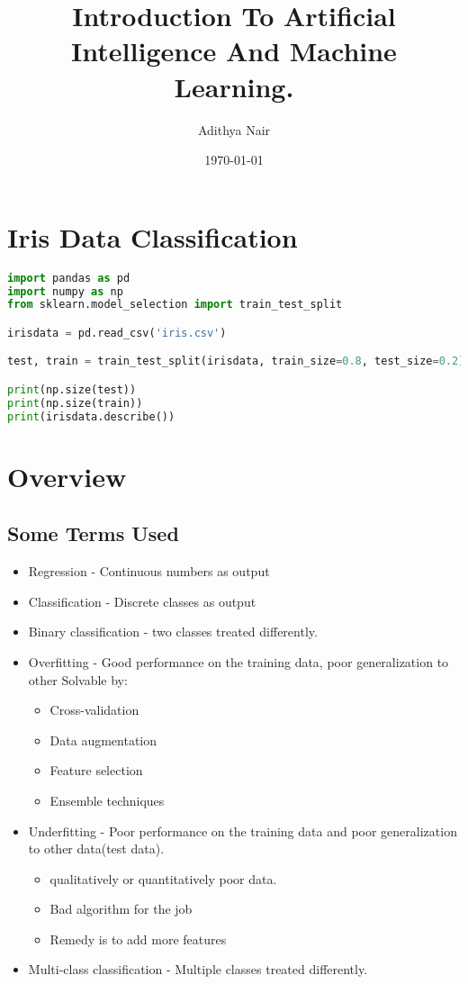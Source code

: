 \documentclass[11pt]{article}
\author{Adithya Nair}
\date{\today}
\title{Introduction To Artificial Intelligence And Machine Learning.}
\makeatletter
\renewcommand{\maketitle}{%
  \begingroup\parindent0pt
  \sffamily
  \Huge{\bfseries\@title}\par\bigskip
  \LARGE{\bfseries\@author}\par\medskip
  \normalsize\@date\par\bigskip
  \endgroup\@afterindentfalse\@afterheading}
\makeatother
\begin{document}
\maketitle
\tableofcontents

\section{Iris Data Classification}
\label{sec:orgdac006a}

\begin{lstlisting}[language=Python,numbers=none]
import pandas as pd
import numpy as np
from sklearn.model_selection import train_test_split

irisdata = pd.read_csv('iris.csv')

test, train = train_test_split(irisdata, train_size=0.8, test_size=0.2)

print(np.size(test))
print(np.size(train))
print(irisdata.describe())
\end{lstlisting}
\section{Overview}
\label{sec:org6d86daa}
\subsection{Some Terms Used}
\label{sec:org38e6dca}
\begin{itemize}
\item Regression - Continuous numbers as output
\item Classification - Discrete classes as output
\item Binary classification - two classes treated differently.
\item Overfitting - Good performance on the training data, poor generalization to other
Solvable by:
\begin{itemize}
\item Cross-validation
\item Data augmentation
\item Feature selection
\item Ensemble techniques
\end{itemize}
\item Underfitting - Poor performance on the training data and poor generalization to other data(test data).
\begin{itemize}
\item qualitatively or quantitatively poor data.
\item Bad algorithm for the job
\item Remedy is to add more features
\end{itemize}
\item Multi-class classification - Multiple classes treated differently.
\end{itemize}
\end{document}
